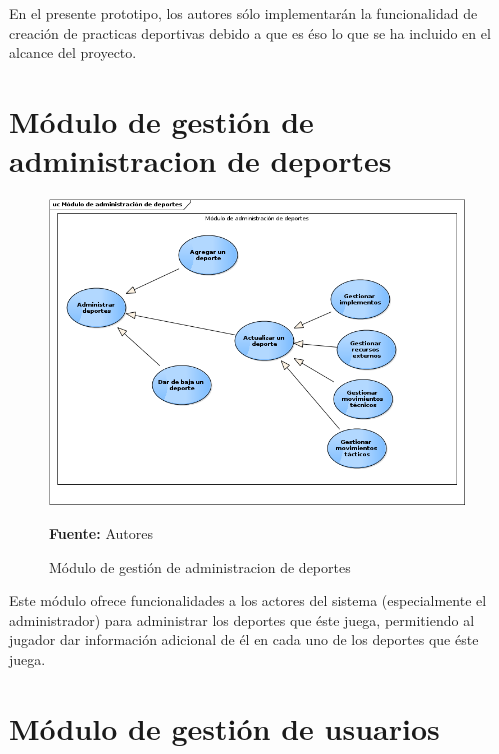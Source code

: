 En el presente prototipo, los autores sólo implementarán la funcionalidad de creación de practicas deportivas debido a que es éso lo que se ha incluido en el alcance del proyecto.

\section{Módulo de gestión de administracion de deportes}

\begin{figure}[!htb]
  \begin{center}
    \includegraphics[width=11cm]{./imagenes/casos_uso/administracion_deportes.png}
    \caption{Módulo de gestión de administracion de deportes}
    \label{fig:cu_admin_dep}
    \textbf{Fuente:} Autores
  \end{center}
\end{figure}

Este módulo ofrece funcionalidades a los actores del sistema (especialmente el administrador) para administrar los deportes que éste juega, permitiendo al jugador dar información adicional de él en cada uno de los deportes que éste juega.

\section{Módulo de gestión de usuarios}

